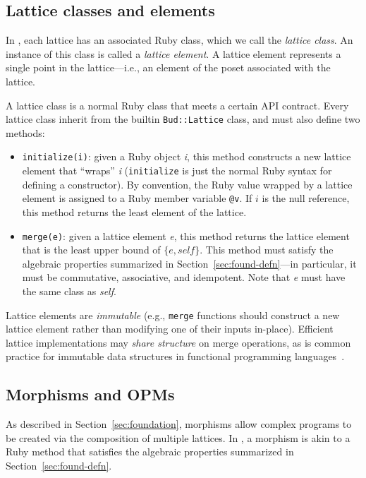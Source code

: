 \subsection{Lattice classes and elements}
\label{sec:lattice-basics}

In \lang, each lattice has an associated Ruby class, which we call the
\emph{lattice class}. An instance of this class is called a \emph{lattice
  element}. A lattice element represents a single point in the lattice---i.e., an
element of the poset associated with the lattice.

A lattice class is a normal Ruby class that meets a certain API contract. Every
lattice class inherit from the builtin \texttt{Bud::Lattice} class, and
must also define two methods:
\begin{itemize}
\item \texttt{initialize(i)}: given a Ruby object \emph{i}, this method
  constructs a new lattice element that ``wraps'' \emph{i} (\texttt{initialize}
  is just the normal Ruby syntax for defining a constructor). By convention, the
  Ruby value wrapped by a lattice element is assigned to a Ruby member variable
  \texttt{@v}. If $i$ is the null reference, this method returns the least
  element of the lattice.

\item \texttt{merge(e)}: given a lattice element \emph{e}, this method returns the
  lattice element that is the least upper bound of $\{e, \textit{self}\}$. This method must
  satisfy the algebraic properties summarized in Section~\ref{sec:found-defn}---in
  particular, it must be commutative, associative, and idempotent. Note that
  \emph{e} must have the same class as \emph{self}.
\end{itemize}
Lattice elements are \emph{immutable} (e.g., \texttt{merge} functions should
construct a new lattice element rather than modifying one of their inputs
in-place). Efficient lattice implementations may \emph{share structure} on merge
operations, as is common practice for immutable data structures in functional
programming languages~\cite{Okasaki1999}. %

\subsection{Morphisms and OPMs}
\label{sec:lattice-funcs}
As described in Section~\ref{sec:foundation}, morphisms allow complex programs
to be created via the composition of multiple lattices. In \lang, a morphism is
akin to a Ruby method that satisfies the algebraic properties summarized in
Section~\ref{sec:found-defn}.

